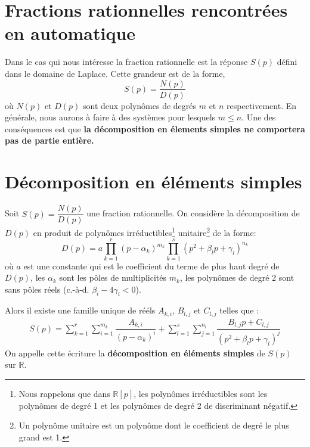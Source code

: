 \section{Fractions rationnelles rencontrées en automatique}
Dans le cas qui nous intéresse la fraction rationnelle est la 
réponse $S(p)$ défini dans le domaine de Laplace.
Cette grandeur est de la forme,
\[
S(p)=\dfrac{N(p)}{D(p)}
\]
où $N(p)$ et $D(p)$ sont deux polynômes de degrés $m$ et $n$ respectivement.
En générale, nous aurons à faire à des systèmes pour lesquels $m\le n$. 
Une des conséquences est que \textbf{la décomposition en élements 
simples ne comportera pas de partie entière.}

\section{Décomposition en éléments simples}
Soit $S(p)=\dfrac{N(p)}{D(p)}$ une fraction rationnelle. On considère la 
décomposition de $D(p)$ en produit de polynômes irréductibles\footnote{Nous 
rappelons que dans $\mathbb{R}[p]$, les polynômes irréductibles sont 
les polynômes de degré 1 et les polynômes de degré 2 de discriminant négatif.}
unitaire\footnote{Un polynôme unitaire est un polynôme dont le coefficient 
de degré le plus grand est 1.} de la forme:
\[
D(p)=a\prod_{k=1}^r(p-\alpha_k)^{m_k}\prod_{k=1}^s(p^2+\beta_lp+\gamma_l)^{n_k}
\]
où $a$ est une constante qui est le coefficient du terme de plus haut degré 
de $D(p)$, les $\alpha_k$ sont les pôles de multiplicités $m_k$, les polynômes
de degré 2 sont sans pôles réels (c.-à-d. $\beta_i-4\gamma_i<0$).

Alors il existe une famille unique de rééls $A_{k,i}$, $B_{l,j}$ et 
$C_{l,j}$ telles que :
\begin{align}
S(p)=\sum_{k=1}^r\sum_{i=1}^{m_k} \dfrac{A_{k,i}}{\left(p-\alpha_k\right)^i}+
     \sum_{l=1}^s\sum_{j=1}^{n_l} \dfrac{B_{l,j}p+C_{l,j}}{\left(p^2+\beta_lp+
     \gamma_l\right)^j}
\end{align}
On appelle cette écriture la \textbf{décomposition en éléments simples} de 
$S(p)$ sur $\mathbb{R}$.
